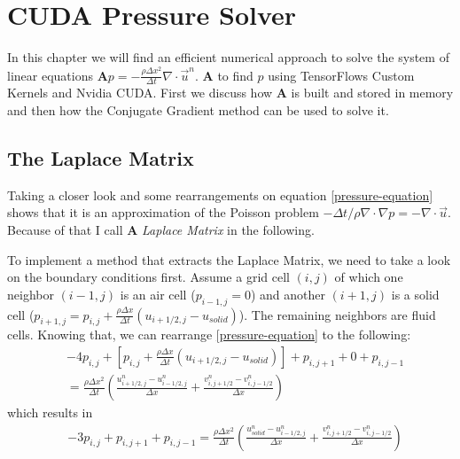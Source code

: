\chapter{CUDA Pressure Solver}\label{chapter:cudapressuresolver}
In this chapter we will find an efficient numerical approach to solve the system of linear equations $\mathbf{A}p = -\frac{\rho \Delta x^2}{\Delta t}\nabla \cdot \vec{u}^n$. $\mathbf{A}$ to find $p$ using TensorFlows Custom Kernels and Nvidia CUDA. First we discuss how $\mathbf{A}$ is built and stored in memory and then how the Conjugate Gradient method can be used to solve it. 
\section{ The Laplace Matrix }
Taking a closer look and some rearrangements on equation \ref{pressure-equation} shows that it is an approximation of the Poisson problem $-\Delta t / \rho \nabla \cdot \nabla p = - \nabla \cdot \vec{u}$. Because of that I call $\mathbf{A}$ \textit{Laplace Matrix} in the following. 
\par To implement a method that extracts the Laplace Matrix, we need to take a look on the boundary conditions first. Assume a grid cell $(i,j)$ of which one neighbor $(i-1,j)$ is an air cell ($p_{i-1,j}=0$) and another $(i+1, j)$ is a solid cell ($p_{i+1,j}= p_{i,j} + \frac{\rho \Delta x}{\Delta t} (u_{i+1/2,j} - u_{solid})$). The remaining neighbors are fluid cells. Knowing that, we can rearrange \ref{pressure-equation} to the following:
\begin{equation} \label{pressure-equation-with-boundaries}
	\begin{aligned}
		& -4p_{i,j} + \left[p_{i,j} + \frac{\rho \Delta x}{\Delta t} (u_{i+1/2,j} - u_{solid}) \right] + p_{i,j+1} + 0 + p_{i,j-1} \\
		& = \frac{\rho \Delta x^2}{\Delta t} \left( \frac{u_{i+1/2,j}^{n} - u_{i-1/2,j}^{n}}{\Delta x} + \frac{v_{i,j+1/2}^{n} - v_{i,j-1/2}^{n}}{\Delta x} \right)
	\end{aligned}
\end{equation}
which results in
\begin{equation} \label{pressure-equation-with-boundaries-resolved}
	\begin{aligned}
		& - 3p_{i,j} + p_{i,j+1} + p_{i,j-1} = \frac{\rho \Delta x^2}{\Delta t} \left( \frac{u_{solid}^{n} - u_{i-1/2,j}^{n}}{\Delta x} + \frac{v_{i,j+1/2}^{n} - v_{i,j-1/2}^{n}}{\Delta x} \right)
	\end{aligned}
\end{equation}
